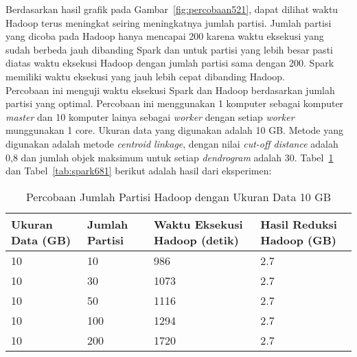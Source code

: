 Berdasarkan hasil grafik pada Gambar~\ref{fig:percobaan521}, dapat dilihat waktu Hadoop terus meningkat seiring meningkatnya jumlah partisi. Jumlah partisi yang dicoba pada Hadoop hanya mencapai 200 karena waktu eksekusi yang sudah berbeda jauh dibanding Spark dan untuk partisi yang lebih besar pasti diatas waktu eksekusi Hadoop dengan jumlah partisi sama dengan 200. Spark memiliki waktu eksekusi yang jauh lebih cepat dibanding Hadoop. \\







Percobaan ini menguji waktu eksekusi Spark dan Hadoop berdasarkan jumlah partisi yang optimal. Percobaan ini menggunakan 1 komputer sebagai komputer \textit{master} dan 10 komputer lainya sebagai \textit{worker} dengan setiap \textit{worker} munggunakan 1 core. Ukuran data yang digunakan adalah 10 GB. Metode yang digunakan adalah metode \textit{centroid linkage}, dengan nilai \textit{cut-off distance} adalah 0,8 dan jumlah objek maksimum untuk setiap \textit{dendrogram} adalah 30. Tabel~\ref{tab:spark671} dan Tabel~\ref{tab:spark681} berikut adalah hasil dari eksperimen:


\begin{table}[H] 
	\centering 
	\caption{Percobaan Jumlah Partisi Hadoop dengan Ukuran Data 10 GB}
	\label{tab:spark671}
	\begin{tabular}{|p{3cm}|p{3cm}|p{4cm}|p{4cm}|}
\hline
Ukuran Data (GB) & Jumlah Partisi &  Waktu Eksekusi Hadoop (detik) & Hasil Reduksi Hadoop (GB)\\
\hline
10 & 10 & 986  & 2.7  \\
\hline
10 & 30 & 1073  & 2.7  \\
\hline
10 & 50 & 1116  & 2.7  \\
\hline
10 & 100 & 1294  & 2.7  \\
\hline
10 & 200 & 1720  & 2.7  \\
\hline

\hline

	\end{tabular} 
\end{table}




